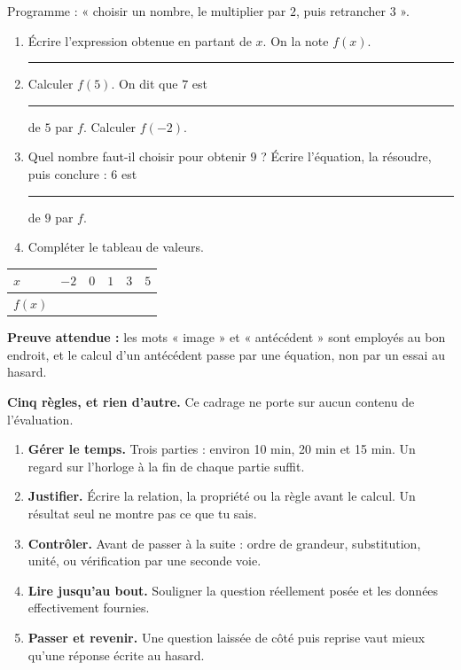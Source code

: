 \documentclass[10pt,a4paper]{article}
\begin{document}
Programme : « choisir un nombre, le multiplier par $2$, puis retrancher $3$ ».
\begin{enumerate}
\item Écrire l'expression obtenue en partant de $x$. On la note $f(x)$. \rule{45mm}{0.32pt}
\item Calculer $f(5)$. On dit que $7$ est \rule{28mm}{0.32pt} de $5$ par $f$. \quad Calculer $f(-2)$.
\item Quel nombre faut-il choisir pour obtenir $9$ ? Écrire l'équation, la résoudre, puis conclure :
$6$ est \rule{28mm}{0.32pt} de $9$ par $f$.
\item Compléter le tableau de valeurs.
\end{enumerate}
\par\noindent\begin{tabularx}{\linewidth}{|>{\bfseries}p{18mm}|X|X|X|X|X|}
\hline
$x$ & $-2$ & $0$ & $1$ & $3$ & $5$ \\ \hline
$f(x)$ & & & & & \\ \hline
\end{tabularx}

\begin{successbox}
\textbf{Preuve attendue :} les mots « image » et « antécédent » sont employés au bon endroit, et le calcul
d'un antécédent passe par une équation, non par un essai au hasard.
\end{successbox}

\needspace{62mm}\par\vspace{3mm}

\begin{methodbox}
\textbf{Cinq règles, et rien d'autre.} Ce cadrage ne porte sur aucun contenu de l'évaluation.
\begin{enumerate}
\item \textbf{Gérer le temps.} Trois parties : environ 10 min, 20 min et 15 min. Un regard sur l'horloge à la fin de chaque partie suffit.
\item \textbf{Justifier.} Écrire la relation, la propriété ou la règle avant le calcul. Un résultat seul ne montre pas ce que tu sais.
\item \textbf{Contrôler.} Avant de passer à la suite : ordre de grandeur, substitution, unité, ou vérification par une seconde voie.
\item \textbf{Lire jusqu'au bout.} Souligner la question réellement posée et les données effectivement fournies.
\item \textbf{Passer et revenir.} Une question laissée de côté puis reprise vaut mieux qu'une réponse écrite au hasard.
\end{enumerate}
\end{methodbox}
\end{document}
